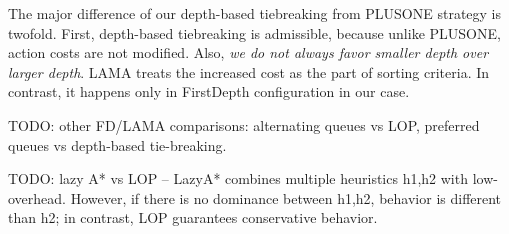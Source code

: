 The major difference of our depth-based tiebreaking from PLUSONE
strategy is twofold.  First, depth-based tiebreaking is admissible, because 
unlike PLUSONE, action costs are not modified.
Also, \emph{we do not always favor smaller depth over
larger depth}. LAMA treats the increased cost as the part of
sorting criteria. In contrast, it happens only in FirstDepth configuration in our case.

TODO: other FD/LAMA comparisons: alternating queues vs LOP,   preferred queues vs depth-based tie-breaking.


TODO:  lazy A* vs LOP -- LazyA* combines multiple heuristics h1,h2 with low-overhead. However, if there is no dominance between h1,h2, behavior is different than h2; in contrast, LOP guarantees conservative behavior.

